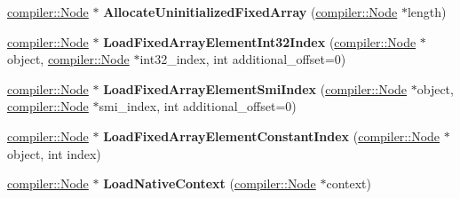 \begin{DoxyCompactItemize}
\item 
\hyperlink{classv8_1_1internal_1_1compiler_1_1_node}{compiler\+::\+Node} $\ast$ {\bfseries Allocate\+Uninitialized\+Fixed\+Array} (\hyperlink{classv8_1_1internal_1_1compiler_1_1_node}{compiler\+::\+Node} $\ast$length)\hypertarget{classv8_1_1internal_1_1_code_stub_assembler_a8aff3c147bde761fc0e605b93d519b6d}{}\label{classv8_1_1internal_1_1_code_stub_assembler_a8aff3c147bde761fc0e605b93d519b6d}

\item 
\hyperlink{classv8_1_1internal_1_1compiler_1_1_node}{compiler\+::\+Node} $\ast$ {\bfseries Load\+Fixed\+Array\+Element\+Int32\+Index} (\hyperlink{classv8_1_1internal_1_1compiler_1_1_node}{compiler\+::\+Node} $\ast$object, \hyperlink{classv8_1_1internal_1_1compiler_1_1_node}{compiler\+::\+Node} $\ast$int32\+\_\+index, int additional\+\_\+offset=0)\hypertarget{classv8_1_1internal_1_1_code_stub_assembler_acf3e5d19bdc79d9f697af19b3c8ffbfc}{}\label{classv8_1_1internal_1_1_code_stub_assembler_acf3e5d19bdc79d9f697af19b3c8ffbfc}

\item 
\hyperlink{classv8_1_1internal_1_1compiler_1_1_node}{compiler\+::\+Node} $\ast$ {\bfseries Load\+Fixed\+Array\+Element\+Smi\+Index} (\hyperlink{classv8_1_1internal_1_1compiler_1_1_node}{compiler\+::\+Node} $\ast$object, \hyperlink{classv8_1_1internal_1_1compiler_1_1_node}{compiler\+::\+Node} $\ast$smi\+\_\+index, int additional\+\_\+offset=0)\hypertarget{classv8_1_1internal_1_1_code_stub_assembler_a527178843b8642c6a00335a92f597564}{}\label{classv8_1_1internal_1_1_code_stub_assembler_a527178843b8642c6a00335a92f597564}

\item 
\hyperlink{classv8_1_1internal_1_1compiler_1_1_node}{compiler\+::\+Node} $\ast$ {\bfseries Load\+Fixed\+Array\+Element\+Constant\+Index} (\hyperlink{classv8_1_1internal_1_1compiler_1_1_node}{compiler\+::\+Node} $\ast$object, int index)\hypertarget{classv8_1_1internal_1_1_code_stub_assembler_a886edcf5fc5f68a5b0fd2fff9038c4d3}{}\label{classv8_1_1internal_1_1_code_stub_assembler_a886edcf5fc5f68a5b0fd2fff9038c4d3}

\item 
\hyperlink{classv8_1_1internal_1_1compiler_1_1_node}{compiler\+::\+Node} $\ast$ {\bfseries Load\+Native\+Context} (\hyperlink{classv8_1_1internal_1_1compiler_1_1_node}{compiler\+::\+Node} $\ast$context)\hypertarget{classv8_1_1internal_1_1_code_stub_assembler_a670b1157963893a317dfcbf61cb37856}{}\label{classv8_1_1internal_1_1_code_stub_assembler_a670b1157963893a317dfcbf61cb37856}


\end{DoxyCompactItemize}

